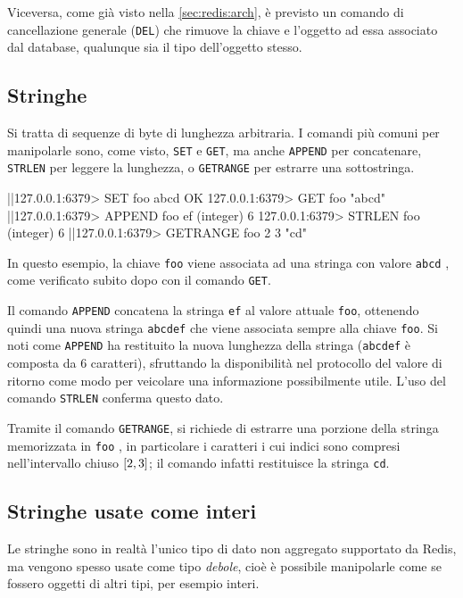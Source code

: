 Viceversa, come già visto nella \autoref{sec:redis:arch}, è previsto un comando di cancellazione
generale (\verb|DEL|) che rimuove la chiave e l'oggetto ad essa associato dal database,
qualunque sia il tipo dell'oggetto stesso.


\subsection{Stringhe}

Si tratta di sequenze di byte di lunghezza arbitraria. I comandi
più comuni per manipolarle sono, come visto, \verb|SET| e \verb|GET|, ma anche \verb|APPEND|
per concatenare, \verb|STRLEN| per leggere la lunghezza, o \verb|GETRANGE| per estrarre una
sottostringa.

\begin{commentedsource}[style=redis]
|\lnote|127.0.0.1:6379> SET foo abcd
OK
127.0.0.1:6379> GET foo
"abcd"
|\lnote|127.0.0.1:6379> APPEND foo ef
(integer) 6
127.0.0.1:6379> STRLEN foo
(integer) 6
|\lnote|127.0.0.1:6379> GETRANGE foo 2 3
"cd"
\end{commentedsource}

In questo esempio, la chiave \verb|foo| viene associata ad una stringa con valore \verb|abcd|
, come verificato subito dopo con il comando \verb|GET|. 

Il comando \verb|APPEND|  concatena la stringa \verb|ef| al valore attuale \verb|foo|,
ottenendo quindi una nuova stringa \verb|abcdef| che viene associata sempre alla chiave \verb|foo|.
Si noti come \verb|APPEND| ha restituito la nuova lunghezza della stringa (\verb|abcdef| è composta
da $6$ caratteri), sfruttando la disponibilità nel protocollo del valore di ritorno come modo per
veicolare una informazione possibilmente utile. L'uso del comando \verb|STRLEN| conferma questo
dato.

Tramite il comando \verb|GETRANGE|, si richiede di estrarre una porzione della stringa memorizzata
in \verb|foo| , in particolare i caratteri i cui indici sono compresi nell'intervallo
chiuso $\interval{2}{3}$; il comando infatti restituisce la stringa \verb|cd|.

\subsection{Stringhe usate come interi}

Le stringhe sono in realtà l'unico tipo di dato non aggregato supportato da Redis, ma vengono spesso
usate come tipo \emph{debole}, cioè è possibile manipolarle come se fossero oggetti di altri tipi,
per esempio interi.

